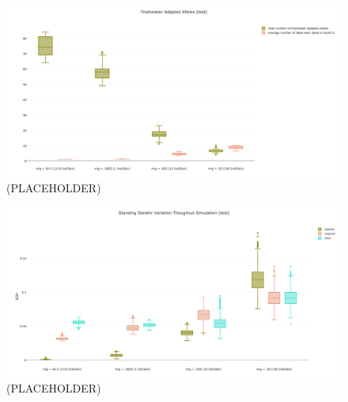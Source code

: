 \documentclass{article}
\begin{document}
\begin{figure}
	\begin{center}
  		\includegraphics[width=\linewidth]{plotlyPlots/NumFAA.png}
  		\caption{(PLACEHOLDER)}
		\label{fig:NumFAA}
	\end{center}
\end{figure}

\begin{figure}
	\begin{center}
  		\includegraphics[width=\linewidth]{plotlyPlots/StandingGeneticVariation.png}
  		\caption{(PLACEHOLDER)}
		\label{fig:SGV}
	\end{center}
\end{figure}
\end{document}
